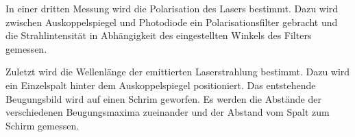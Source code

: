 In einer dritten Messung wird die Polarisation des Lasers bestimmt. Dazu wird
zwischen Auskoppelspiegel und Photodiode ein Polarisationsfilter gebracht und
die Strahlintensität in Abhängigkeit des eingestellten Winkels des Filters
gemessen.

Zuletzt wird die Wellenlänge der emittierten Laserstrahlung bestimmt. Dazu wird
ein Einzelspalt hinter dem Auskoppelspiegel positioniert. Das entstehende
Beugungsbild wird auf einen Schrim geworfen. Es werden die Abstände der
verschiedenen Beugungsmaxima zueinander und der Abstand vom Spalt zum Schirm
gemessen.
